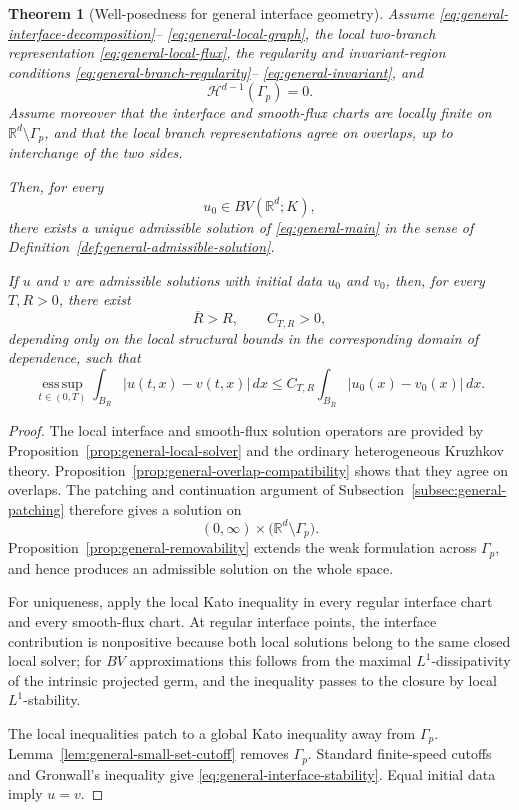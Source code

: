 \documentclass[11pt]{amsart}
\numberwithin{equation}{section}
\theoremstyle{plain}
\newtheorem{theorem}{Theorem}[section]
\theoremstyle{definition}
\theoremstyle{remark}
\begin{document}
\begin{theorem}[Well-posedness for general interface geometry]
\label{thm:general-interface}
Assume
\eqref{eq:general-interface-decomposition}--%
\eqref{eq:general-local-graph},
the local two-branch representation
\eqref{eq:general-local-flux},
the regularity and invariant-region conditions
\eqref{eq:general-branch-regularity}--%
\eqref{eq:general-invariant},
and
\[
    \mathcal H^{d-1}(\Gamma_p)=0.
\]
Assume moreover that the interface and smooth-flux charts are locally finite
on \(\mathbb R^d\setminus\Gamma_p\), and that the local branch
representations agree on overlaps, up to interchange of the two sides.

Then, for every
\[
    u_0\in BV(\mathbb R^d;K),
\]
there exists a unique admissible solution of
\eqref{eq:general-main} in the sense of
Definition~\ref{def:general-admissible-solution}.

If \(u\) and \(v\) are admissible solutions with initial data \(u_0\) and
\(v_0\), then, for every \(T,R>0\), there exist
\[
    \overline R>R,
    \qquad
    C_{T,R}>0,
\]
depending only on the local structural bounds in the corresponding domain of
dependence, such that
\begin{equation}
\label{eq:general-interface-stability}
\operatorname*{ess\,sup}_{t\in(0,T)}
\int_{B_R}
    |u(t,x)-v(t,x)|
\,dx
\le
C_{T,R}
\int_{B_{\overline R}}
    |u_0(x)-v_0(x)|
\,dx.
\end{equation}
\end{theorem}

\begin{proof}
The local interface and smooth-flux solution operators are provided by
Proposition~\ref{prop:general-local-solver} and the ordinary heterogeneous
Kruzhkov theory. Proposition~\ref{prop:general-overlap-compatibility}
shows that they agree on overlaps. The patching and continuation argument of
Subsection~\ref{subsec:general-patching} therefore gives a solution on
\[
    (0,\infty)
    \times
    \bigl(\mathbb R^d\setminus\Gamma_p\bigr).
\]
Proposition~\ref{prop:general-removability} extends the weak formulation
across \(\Gamma_p\), and hence produces an admissible solution on the whole
space.

For uniqueness, apply the local Kato inequality in every regular interface
chart and every smooth-flux chart. At regular interface points, the interface
contribution is nonpositive because both local solutions belong to the same
closed local solver; for \(BV\) approximations this follows from the maximal
\(L^1\)-dissipativity of the intrinsic projected germ, and the inequality
passes to the closure by local \(L^1\)-stability.

The local inequalities patch to a global Kato inequality away from
\(\Gamma_p\). Lemma~\ref{lem:general-small-set-cutoff} removes
\(\Gamma_p\). Standard finite-speed cutoffs and Gronwall's inequality give
\eqref{eq:general-interface-stability}. Equal initial data imply \(u=v\).
\end{proof}
\end{document}
